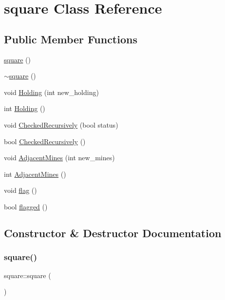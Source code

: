 \hypertarget{classsquare}{}\section{square Class Reference}
\label{classsquare}
\subsection*{Public Member Functions}
\begin{DoxyCompactItemize}
\item 
\mbox{\hyperlink{classsquare_ab244ecd9e1c5f467c2fa889d25d01766}{square}} ()
\item 
\mbox{\hyperlink{classsquare_ab29ccc5385134eb07dadb0ef0f3417b6}{$\sim$square}} ()
\item 
void \mbox{\hyperlink{classsquare_a1f8541dab03c453d7cfc0e95687b4056}{Holding}} (int new\+\_\+holding)
\item 
int \mbox{\hyperlink{classsquare_a891498f84fd9d6f4c412369fe51e7347}{Holding}} ()
\item 
void \mbox{\hyperlink{classsquare_a0a16171bace3d7e23c4b40bad476f32a}{Checked\+Recursively}} (bool status)
\item 
bool \mbox{\hyperlink{classsquare_acb16014b1e47b12b5f8e982d2c5a33f9}{Checked\+Recursively}} ()
\item 
void \mbox{\hyperlink{classsquare_a25e18a690d8096805b4ddcb97dbbf642}{Adjacent\+Mines}} (int new\+\_\+mines)
\item 
int \mbox{\hyperlink{classsquare_a168cd493b64467001a305ca1298b91f5}{Adjacent\+Mines}} ()
\item 
void \mbox{\hyperlink{classsquare_abace20e896650bde44fedfa7a1535d33}{flag}} ()
\item 
bool \mbox{\hyperlink{classsquare_a9061ee58195323e1d2c63d5ee4ef69d7}{flagged}} ()
\end{DoxyCompactItemize}


\subsection{Constructor \& Destructor Documentation}
\mbox{\label{classsquare_ab244ecd9e1c5f467c2fa889d25d01766}} 
\subsubsection{\texorpdfstring{square()}{square()}}
{\footnotesize\ttfamily square\+::square (\begin{DoxyParamCaption}{ }\end{DoxyParamCaption})}

